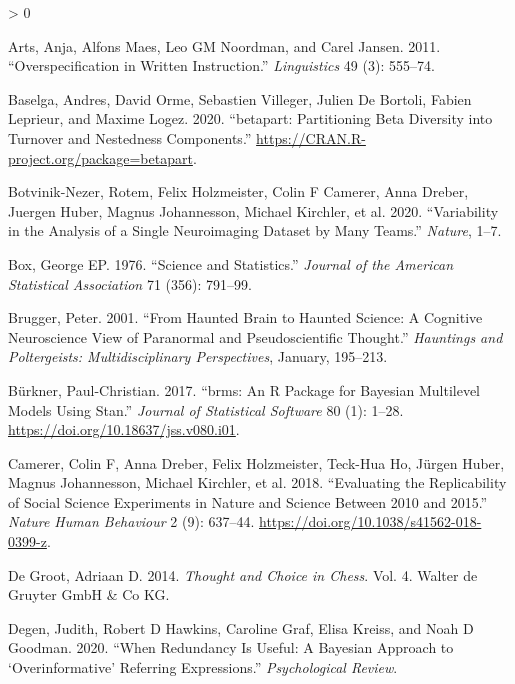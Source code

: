 \documentclass[
  12pt,
]{article}
\newlength{\cslhangindent}
\newenvironment{CSLReferences}[2] %
 {%
  \setlength{\parindent}{0pt}
  \ifodd #1 \everypar{\setlength{\hangindent}{\cslhangindent}}\ignorespaces\fi
  \ifnum #2 > 0
  \setlength{\parskip}{#2\baselineskip}
  \fi
 }%
 {}
\begin{document}
\hypertarget{refs}{}
\begin{CSLReferences}{1}{0}
\leavevmode\hypertarget{ref-arts2011overspecification}{}%
Arts, Anja, Alfons Maes, Leo GM Noordman, and Carel Jansen. 2011. {``Overspecification in Written Instruction.''} \emph{Linguistics} 49 (3): 555--74.

\leavevmode\hypertarget{ref-baselga2020}{}%
Baselga, Andres, David Orme, Sebastien Villeger, Julien De Bortoli, Fabien Leprieur, and Maxime Logez. 2020. {``{b}etapart: Partitioning Beta Diversity into Turnover and Nestedness Components.''} \url{https://CRAN.R-project.org/package=betapart}.

\leavevmode\hypertarget{ref-botvinik2020variability}{}%
Botvinik-Nezer, Rotem, Felix Holzmeister, Colin F Camerer, Anna Dreber, Juergen Huber, Magnus Johannesson, Michael Kirchler, et al. 2020. {``Variability in the Analysis of a Single Neuroimaging Dataset by Many Teams.''} \emph{Nature}, 1--7.

\leavevmode\hypertarget{ref-box1976science}{}%
Box, George EP. 1976. {``Science and Statistics.''} \emph{Journal of the American Statistical Association} 71 (356): 791--99.

\leavevmode\hypertarget{ref-brugger2001}{}%
Brugger, Peter. 2001. {``From Haunted Brain to Haunted Science: A Cognitive Neuroscience View of Paranormal and Pseudoscientific Thought.''} \emph{Hauntings and Poltergeists: Multidisciplinary Perspectives}, January, 195--213.

\leavevmode\hypertarget{ref-burkner2017}{}%
Bürkner, Paul-Christian. 2017. {``{brms}: An {R} Package for {Bayesian} Multilevel Models Using {Stan}.''} \emph{Journal of Statistical Software} 80 (1): 1--28. \url{https://doi.org/10.18637/jss.v080.i01}.

\leavevmode\hypertarget{ref-camerer2018evaluating}{}%
Camerer, Colin F, Anna Dreber, Felix Holzmeister, Teck-Hua Ho, Jürgen Huber, Magnus Johannesson, Michael Kirchler, et al. 2018. {``Evaluating the Replicability of Social Science Experiments in Nature and Science Between 2010 and 2015.''} \emph{Nature Human Behaviour} 2 (9): 637--44. \url{https://doi.org/10.1038/s41562-018-0399-z}.

\leavevmode\hypertarget{ref-de2014thought}{}%
De Groot, Adriaan D. 2014. \emph{Thought and Choice in Chess}. Vol. 4. Walter de Gruyter GmbH \& Co KG.

\leavevmode\hypertarget{ref-degen2020redundancy}{}%
Degen, Judith, Robert D Hawkins, Caroline Graf, Elisa Kreiss, and Noah D Goodman. 2020. {``When Redundancy Is Useful: A Bayesian Approach to {`Overinformative'} Referring Expressions.''} \emph{Psychological Review}.


\end{CSLReferences}
\end{document}
